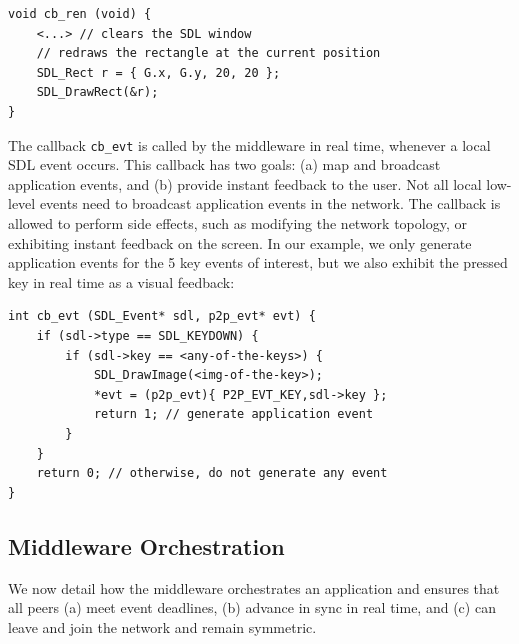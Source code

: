 \documentclass[12pt]{article}
\newcommand{\code}[1]  {\texttt{\small{#1}}}
\begin{document}
{\footnotesize
\begin{verbatim}
void cb_ren (void) {
    <...> // clears the SDL window
    // redraws the rectangle at the current position
    SDL_Rect r = { G.x, G.y, 20, 20 };
    SDL_DrawRect(&r);
}
\end{verbatim}
}


The callback \code{cb\_evt} is called by the middleware in real time, whenever
a local SDL event occurs.
This callback has two goals:
    (a) map and broadcast application events, and
    (b) provide instant feedback to the user.
Not all local low-level events need to broadcast application events in the
network.
The callback is allowed to perform side effects, such as modifying the network
topology, or exhibiting instant feedback on the screen.
In our example, we only generate application events for the 5 key events of
interest, but we also exhibit the pressed key in real time as a visual
feedback:

{\footnotesize
\begin{verbatim}
int cb_evt (SDL_Event* sdl, p2p_evt* evt) {
    if (sdl->type == SDL_KEYDOWN) {
        if (sdl->key == <any-of-the-keys>) {
            SDL_DrawImage(<img-of-the-key>);
            *evt = (p2p_evt){ P2P_EVT_KEY,sdl->key };
            return 1; // generate application event
        }
    }
    return 0; // otherwise, do not generate any event
}
\end{verbatim}
}

\subsection{Middleware Orchestration}
\label{sec.tml.middleware}

We now detail how the middleware orchestrates an application and ensures that
all peers
    (a) meet event deadlines,
    (b) advance in sync in real time, and
    (c) can leave and join the network and remain symmetric.

\end{document}

